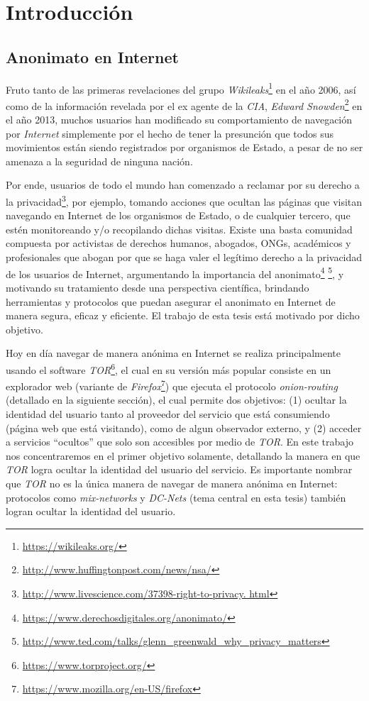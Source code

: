 \chapter{Introducción}\label{cap1}

\section{Anonimato en Internet}

Fruto tanto de las primeras revelaciones del grupo \emph{Wikileaks}\footnote{\url{https://wikileaks.org/}} en el año 2006, 
así como de la información revelada por el ex agente de la \emph{CIA}, \emph{Edward Snowden}\footnote{\url{http://www.huffingtonpost.com/news/nsa/}} 
en el año 2013, muchos usuarios han modificado su comportamiento de navegación por \emph{Internet} simplemente por el hecho de tener la presunción que todos sus movimientos están siendo 
registrados por organismos de Estado, a pesar de no ser amenaza a la seguridad de ninguna nación.

Por ende, usuarios de todo el mundo han comenzado a reclamar por su derecho a la privacidad\footnote{\url{http://www.livescience.com/37398-right-to-privacy.
html}}, por ejemplo, tomando acciones que ocultan las páginas que visitan navegando en Internet de los organismos de Estado, o de cualquier tercero, que estén monitoreando y/o recopilando dichas visitas. 
Existe una basta comunidad compuesta por activistas de derechos humanos, abogados, ONGs, académicos y profesionales 
que abogan por que se haga valer el legítimo derecho a la 
privacidad de los usuarios de Internet, argumentando la importancia del anonimato\footnote{\url{https://www.derechosdigitales.org/anonimato/}} 
\footnote{\url{http://www.ted.com/talks/glenn_greenwald_why_privacy_matters}}, y motivando su tratamiento desde una perspectiva científica, brindando herramientas y protocolos que puedan asegurar el 
anonimato en Internet de manera segura, eficaz y eficiente. 
El trabajo de esta tesis está motivado por dicho objetivo.

Hoy en día navegar de manera anónima en Internet se realiza principalmente usando el software \emph{TOR}\footnote{\url{https://www.torproject.org/}}, 
el cual en su versión más popular consiste en un explorador web (variante de 
\emph{Firefox}\footnote{\url{https://www.mozilla.org/en-US/firefox}}) que ejecuta el protocolo \emph{onion-routing} 
(detallado en la siguiente sección), el cual permite dos objetivos: (1) ocultar la identidad del usuario tanto al proveedor 
del servicio que está consumiendo (página web que está visitando), como de algun observador externo, y (2) acceder a servicios ``ocultos'' que solo 
son accesibles por medio de \emph{TOR}. En este trabajo nos concentraremos en el primer objetivo solamente, detallando la manera en que 
\emph{TOR} logra ocultar la identidad del usuario del servicio. Es importante nombrar que \emph{TOR} no es la única manera de 
navegar de manera anónima en Internet: protocolos como \emph{mix-networks} y \emph{DC-Nets} (tema central en esta tesis) también logran ocultar la identidad del usuario.


